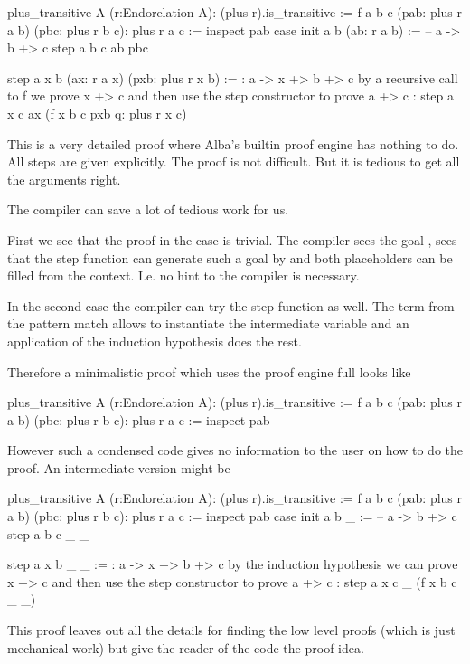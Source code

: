 \begin{alba}
  plus_transitive A (r:Endorelation A): (plus r).is_transitive :=
    f a b c (pab: plus r a b) (pbc: plus r b c): plus r a c :=
      inspect
        pab
      case
        init a b (ab: r a b) :=
            -- a -> b +> c
          step a b c ab pbc

        step a x b (ax: r a x) (pxb: plus r x b) :=
            {: a -> x +> b +> c
               by a recursive call to f we prove x +> c
               and then use the step constructor to prove a +> c :}
          step a x c ax (f x b c pxb q: plus r x c)
\end{alba}

This is a very detailed proof where Alba's builtin proof engine has nothing to
do. All steps are given explicitly. The proof is not difficult. But it is
tedious to get all the arguments right.

The compiler can save  a lot of tedious work for us.

First we see that the proof in the  case is trivial. The compiler
sees the goal , sees that the step function can generate such
a goal by  and both placeholders
can be filled from the context. I.e. no hint to the compiler is necessary.

In the second case the compiler can try the step function as well. The term
 from the pattern match allows to instantiate the intermediate
variable  and an application of the induction hypothesis does the
rest.

Therefore a minimalistic proof which uses the proof engine full looks like
%
\begin{alba}
  plus_transitive A (r:Endorelation A): (plus r).is_transitive :=
    f a b c (pab: plus r a b) (pbc: plus r b c): plus r a c :=
      inspect
        pab
\end{alba}
%
However such a condensed code gives no information to the user on how to do
the proof. An intermediate version might be
%
\begin{alba}
  plus_transitive A (r:Endorelation A): (plus r).is_transitive :=
    f a b c (pab: plus r a b) (pbc: plus r b c): plus r a c :=
      inspect
        pab
      case
        init a b _ :=
            -- a -> b +> c
          step a b c _ _

        step a x b _ _ :=
            {: a -> x +> b +> c
               by the induction hypothesis we can prove x +> c
               and then use the step constructor to prove a +> c :}
          step a x c _ (f x b c _ _)
\end{alba}
%
This proof leaves out all the details for finding the low level proofs (which
is just mechanical work) but give the reader of the code the proof idea.



